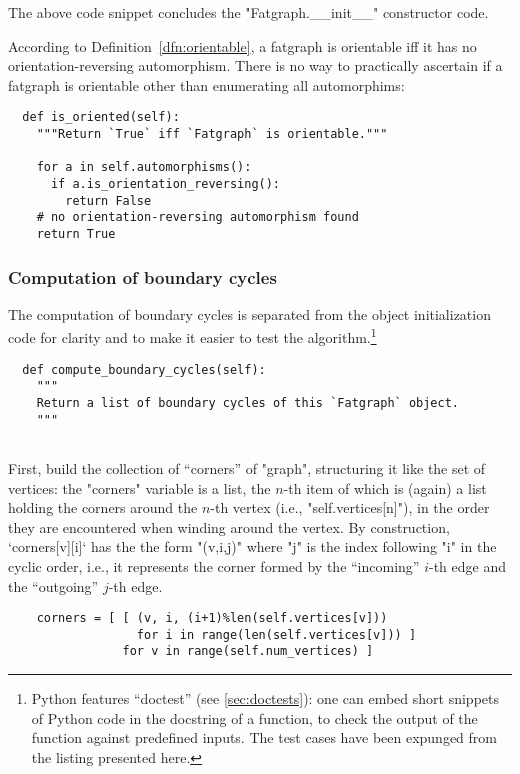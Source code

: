 The above code snippet concludes the "Fatgraph.__init__" constructor
code.

According to Definition~\ref{dfn:orientable}, a fatgraph is orientable iff it
has no orientation-reversing automorphism.  There is no
way to practically ascertain if a fatgraph is orientable other than
enumerating all automorphims:
\begin{lstlisting}
  def is_oriented(self):
    """Return `True` iff `Fatgraph` is orientable."""

    for a in self.automorphisms():
      if a.is_orientation_reversing():
        return False
    # no orientation-reversing automorphism found
    return True

\end{lstlisting}


\subsubsection{Computation of boundary cycles}
\label{sec:compute-boundary-cycles}

The computation of boundary cycles is separated from the object
initialization code for clarity and to make it easier to test the
algorithm.\footnote{Python features ``doctest'' (see
  \ref{sec:doctests}): one can embed short snippets of Python code in
  the docstring of a function, to check the output of the function
  against predefined inputs.  The test cases have been expunged from
  the listing presented here.}
\begin{lstlisting}
  def compute_boundary_cycles(self):
    """
    Return a list of boundary cycles of this `Fatgraph` object.
    """
    
\end{lstlisting}
First, build the collection of ``corners'' of "graph", structuring it
like the set of vertices: the "corners" variable is a list, the $n$-th
item of which is (again) a list holding the corners around the $n$-th
vertex (i.e., "self.vertices[n]"), in the order they are encountered
when winding around the vertex.  By construction, `corners[v][i]` has
the the form "(v,i,j)" where "j" is the index following "i" in the
cyclic order, i.e., it represents the corner formed by the
``incoming'' $i$-th edge and the ``outgoing'' $j$-th edge.
\begin{lstlisting}
    corners = [ [ (v, i, (i+1)%len(self.vertices[v]))
                  for i in range(len(self.vertices[v])) ]
                for v in range(self.num_vertices) ]

\end{lstlisting}

